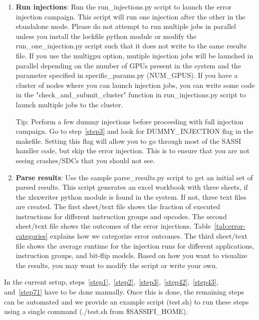 \begin{enumerate}
\item {\bf Run injections}: 
		Run the run\_injections.py script to launch the error injection campaign.
		This script will run one injection after the other in the standalone mode.
		Please do not attempt to run multiple jobs in parallel unless you install
		the lockfile python module or modify the run\_one\_injection.py script such
		that it does not write to the same results file.  If you use the multigpu
		option, mutiple injection jobs will be launched in parallel depending on
		the number of GPUs present in the system and the parameter  specified in
		specific\_params.py (NUM\_GPUS).  If you have a cluster of nodes where you
		can launch injection jobs, you can write some code in the
		"check\_and\_submit\_cluster" function in run\_injections.py script to
		launch multiple jobs to the cluster.  

		Tip: Perform a few dummy injections before proceeding with full injection
		campaign. Go to step~\ref{step3} and look for DUMMY\_INJECTION flag in the
		makefile. Setting this flag will allow you to go through most of the SASSI
		handler code, but skip the error injection. This is to ensure that you are
		not seeing crashes/SDCs that you should not see.
\label{step8}

\item {\bf Parse results}:
		Use the sample parse\_results.py script to get an initial set of parsed
		results.  This script generates an excel workbook with three sheets, if the
		xlsxwriter python module is found in the system. If not, three text files
		are created. The first sheet/text file shows the fraction of executed
		instructions for different instruction groups and opcodes. The second
		sheet/text file shows the outcomes of the error injections.
		Table~\ref{tab:error-categories} explains how we categorize error outcomes.
		The third sheet/text file shows the average runtime for the injection runs
		for different applications, instruction groups, and bit-flip models. Based
		on how you want to visualize the results, you may want to modify the script
		or write your own. 
\label{step9}

\end{enumerate}


In the current setup,
steps~\ref{step1},~\ref{step2},~\ref{step3},~\ref{step42},~\ref{step43},
and~\ref{step71} have to be done manually.  Once this is done, the remaining
steps can be automated and we provide an example script (test.sh) to run these
steps using a single command (./test.sh from \$SASSIFI\_HOME). 

